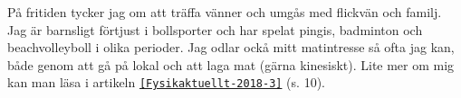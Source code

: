 


\begin{cvparagraph}
På fritiden tycker jag om att träffa vänner och umgås med flickvän och familj.
Jag är barnsligt förtjust i bollsporter och har spelat pingis, badminton och beachvolleyboll i olika perioder.
Jag odlar ockå mitt matintresse så ofta jag kan, både genom att gå på lokal och att laga mat (gärna kinesiskt).
Lite mer om mig kan man läsa i artikeln \href{http://www.fysikersamfundet.se/wp-content/uploads/Fysikaktuellt3-18_Webb.pdf}{\texttt{[Fysikaktuellt-2018-3]}} (s. 10).
\end{cvparagraph}